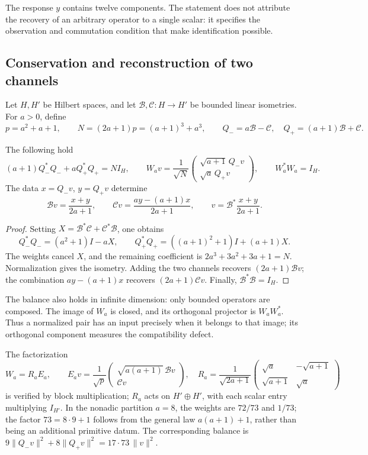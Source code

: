 The response \(y\) contains twelve components. The statement does not
attribute the recovery of an arbitrary operator to a single scalar:
it specifies the observation and commutation condition that make identification possible.

\subsection{Conservation and reconstruction of two channels}
\label{iv:subsec:acoplamiento-bilateral}

Let \(H,H'\) be Hilbert spaces, and let
\(\mathcal B,\mathcal C:H\to H'\) be bounded linear isometries.
For \(a>0\), define
\[
 p=a^2+a+1,\qquad N=(2a+1)p=(a+1)^3+a^3,\qquad
 Q_-=a\mathcal B-\mathcal C,\quad Q_+=(a+1)\mathcal B+\mathcal C.
\]

\begin{theorem}
\label{iv:thm:acoplamiento-balance}
The following hold
\[
 (a+1)Q_-^*Q_-+aQ_+^*Q_+=NI_H,\qquad
 W_av=\frac1{\sqrt N}
 \begin{pmatrix}\sqrt{a+1}\,Q_-v\\\sqrt a\,Q_+v\end{pmatrix},
 \qquad W_a^*W_a=I_H.
\]
The data \(x=Q_-v\), \(y=Q_+v\) determine
\[
 \mathcal Bv=\frac{x+y}{2a+1},\qquad
 \mathcal Cv=\frac{ay-(a+1)x}{2a+1},\qquad
 v=\mathcal B^*\frac{x+y}{2a+1}.
\]
\end{theorem}
\begin{proof}
Setting \(X=\mathcal B^*\mathcal C+\mathcal C^*\mathcal B\), one obtains
\[
 Q_-^*Q_-=(a^2+1)I-aX,\qquad
 Q_+^*Q_+=((a+1)^2+1)I+(a+1)X.
\]
The weights cancel \(X\), and the remaining coefficient is
\(2a^3+3a^2+3a+1=N\). Normalization gives the isometry.
Adding the two channels recovers \((2a+1)\mathcal Bv\);
the combination \(ay-(a+1)x\) recovers \((2a+1)\mathcal Cv\).
Finally, \(\mathcal B^*\mathcal B=I_H\).
\end{proof}

The balance also holds in infinite dimension: only bounded operators
are composed. The image of \(W_a\) is closed, and its orthogonal
projector is \(W_aW_a^*\). Thus a normalized pair has an
input precisely when it belongs to that image; its orthogonal
component measures the compatibility defect.

The factorization
\[
 W_a=R_aE_a,\qquad
 E_av=\frac1{\sqrt p}
 \begin{pmatrix}\sqrt{a(a+1)}\,\mathcal Bv\\\mathcal Cv\end{pmatrix},
 \quad
 R_a=\frac1{\sqrt{2a+1}}
 \begin{pmatrix}\sqrt a&-\sqrt{a+1}\\
 \sqrt{a+1}&\sqrt a\end{pmatrix}
\]
is verified by block multiplication; \(R_a\) acts on
\(H'\oplus H'\), with each scalar entry multiplying \(I_{H'}\).
In the nonadic partition
\(a=8\), the weights are \(72/73\) and \(1/73\); the factor
\(73=8\cdot9+1\) follows from the general law
\(a(a+1)+1\), rather than being an additional primitive datum. The corresponding balance is
\(9\|Q_-v\|^2+8\|Q_+v\|^2=17\cdot73\,\|v\|^2\).

